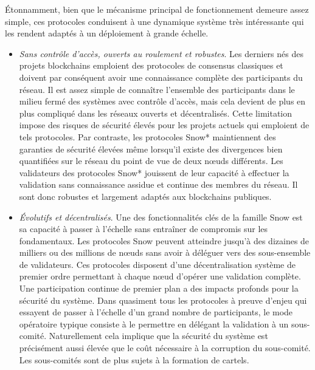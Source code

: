 \documentclass[runningheads,francais,a4paper]{llncs}
\begin{document}
Étonnamment, bien que le mécanisme principal de fonctionnement demeure assez simple, ces protocoles conduisent à une
dynamique système très intéressante qui les rendent adaptés à un déploiement à grande échelle.
\begin{itemize}
\item \textit{Sans contrôle d'accès, ouverts au roulement et robustes}. Les derniers nés des projets blockchains
emploient des protocoles de consensus classiques et doivent par conséquent avoir une connaissance complète des
participants du réseau. Il est assez simple de connaître l'ensemble des participants dans le milieu fermé des systèmes
avec contrôle d'accès, mais cela devient de plus en plus compliqué dans les réseaux ouverts et décentralisés. Cette
limitation impose des risques de sécurité élevés pour les projets actuels qui emploient de tels protocoles. Par
contraste, les protocoles Snow* maintiennent des garanties de sécurité élevées même lorsqu'il existe des divergences
bien quantifiées sur le réseau du point de vue de deux nœuds différents. Les validateurs des protocoles Snow* jouissent
de leur capacité à effectuer la validation sans connaissance assidue et continue des membres du réseau. Il sont donc
robustes et largement adaptés aux blockchains publiques.
\item \textit{Évolutifs et décentralisés}. Une des fonctionnalités clés de la famille Snow est sa capacité à passer à
l'échelle sans entraîner de compromis sur les fondamentaux. Les protocoles Snow peuvent atteindre jusqu'à des dizaines
de milliers ou des millions de nœuds sans avoir à déléguer vers des sous-ensemble de validateurs. Ces protocoles
disposent d'une décentralisation système de premier ordre permettant à chaque nœud d'opérer une validation complète.
Une participation continue de premier plan a des impacts profonds pour la sécurité du système. Dans quasiment tous
les protocoles à preuve d'enjeu qui essayent de passer à l'échelle d'un grand nombre de participants, le mode opératoire
typique consiste à le permettre en délégant la validation à un sous-comité. Naturellement cela
implique que la sécurité du système est précisément aussi élevée que le coût nécessaire à la corruption du sous-comité.
Les sous-comités sont de plus sujets à la formation de cartels.


\end{itemize}
\end{document}
